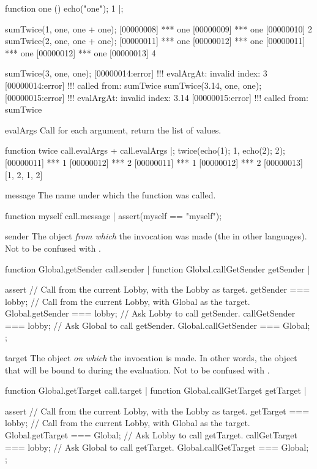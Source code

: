 \begin{urbiscriptapi}
\begin{urbiscript}
function one () { echo("one"); 1 }|;

sumTwice(1, one, one + one);
[00000008] *** one
[00000009] *** one
[00000010] 2
sumTwice(2, one, one + one);
[00000011] *** one
[00000012] *** one
[00000011] *** one
[00000012] *** one
[00000013] 4

sumTwice(3, one, one);
[00000014:error] !!! evalArgAt: invalid index: 3
[00000014:error] !!!    called from: sumTwice
sumTwice(3.14, one, one);
[00000015:error] !!! evalArgAt: invalid index: 3.14
[00000015:error] !!!    called from: sumTwice
\end{urbiscript}

\item[evalArgs]%
  Call  for each argument, return the list of values.
\begin{urbiscript}
function twice
{
  call.evalArgs + call.evalArgs
}|;
twice({echo(1); 1}, {echo(2); 2});
[00000011] *** 1
[00000012] *** 2
[00000011] *** 1
[00000012] *** 2
[00000013] [1, 2, 1, 2]
\end{urbiscript}

\item[message]
  The name under which the function was called.
\begin{urbiscript}
function myself { call.message }|
assert(myself == "myself");
\end{urbiscript}

\item[sender]%
  The object \emph{from which} the invocation was made (the  in
  other languages).  Not to be confused with .
\begin{urbiscript}
function Global.getSender { call.sender } |
function Global.callGetSender { getSender } |

assert
{
  // Call from the current Lobby, with the Lobby as target.
  getSender === lobby;
  // Call from the current Lobby, with Global as the target.
  Global.getSender === lobby;
  // Ask Lobby to call getSender.
  callGetSender === lobby;
  // Ask Global to call getSender.
  Global.callGetSender === Global;
};
\end{urbiscript}

\item[target]%
  The object \emph{on which} the invocation is made.  In other words, the
  object that will be bound to \this during the evaluation.  Not to be
  confused with .
\begin{urbiscript}
function Global.getTarget { call.target } |
function Global.callGetTarget { getTarget } |

assert
{
  // Call from the current Lobby, with the Lobby as target.
  getTarget === lobby;
  // Call from the current Lobby, with Global as the target.
  Global.getTarget === Global;
  // Ask Lobby to call getTarget.
  callGetTarget === lobby;
  // Ask Global to call getTarget.
  Global.callGetTarget === Global;
};
\end{urbiscript}

\end{urbiscriptapi}


